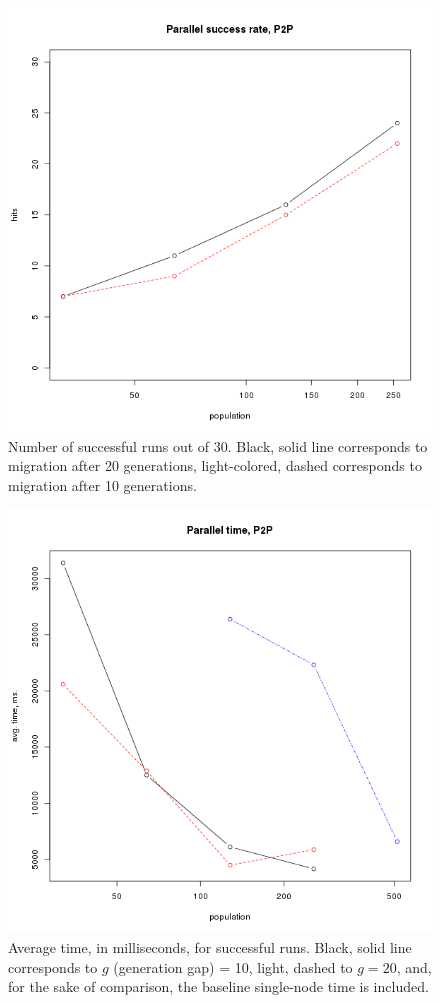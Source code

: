 \documentclass{sig-alternate}
\begin{document}
\begin{figure}[htb]
\centering
   \includegraphics[scale=0.4]{parallel-hits-pop.png}
\caption{Number of successful runs out of 30. Black, solid line
  corresponds to migration after 20 generations, light-colored, dashed
corresponds to migration after 10 generations.}
\label{fig:p2p:hits}
\end{figure}
%
\begin{figure}[htb]
\centering
   \includegraphics[scale=0.4]{parallel-time-pop.png}
\caption{Average time, in milliseconds, for successful runs. Black,
  solid line corresponds to $g$ (generation gap) = 10, light, dashed
  to $g=20$, and, for the sake of comparison, the baseline single-node
time is included. }
\label{fig:p2p:time}
\end{figure}
\end{document}
